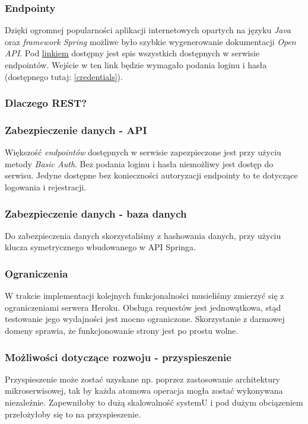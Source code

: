 \subsubsection{Endpointy}
Dzięki ogromnej popularności aplikacji internetowych opartych na języku \textit{Java} oraz \textit{framework Spring} możliwe było szybkie wygenerowanie dokumentacji \textit{Open API}. Pod \href{https://trunk-kartapacjentaservice.herokuapp.com/swagger-ui.html} {linkiem} dostępny jest spis wszystkich dostępnych w serwisie endpointów. Wejście w ten link będzie wymagało podania loginu i hasła (dostępnego tutaj: \ref{credentials}).

\clearpage
\subsubsection{Dlaczego REST?}


\subsubsection{Zabezpieczenie danych - API}
Większość \textit{endpointów} dostępnych w serwisie zapezpieczone jest przy użyciu metody \textit{Basic Auth}. Bez podania loginu i hasła niemożliwy jest dostęp do serwisu. Jedyne dostępne bez konieczności autoryzacji endpointy to te dotyczące logowania i rejestracji.

\subsubsection{Zabezpieczenie danych - baza danych}
Do zabezpieczenia danych skorzystaliśmy z hashowania danych, przy użyciu klucza symetrycznego wbudowanego w API Springa.

\subsubsection{Ograniczenia}
W trakcie implementacji kolejnych funkcjonalności musieliśmy zmierzyć się z ograniczeniami serwera Heroku. Obsługa requestów jest jednowątkowa, stąd testowanie jego wydajności jest mocno ograniczone.
Skorzystanie z darmowej domeny sprawia, że funkcjonowanie strony jest po prostu wolne.
\subsubsection{Możliwości dotyczące rozwoju - przyspieszenie}
Przyspieszenie może zostać uzyskane np. poprzez zastosowanie architektury mikroserwisowej, tak by każda atomowa operacja mogła zostać wykonywana niezaleźnie. Zapewniłoby to dużą skalowalność systemU i pod dużym obciązeniem przełożyłoby się to na przyspieszenie. 